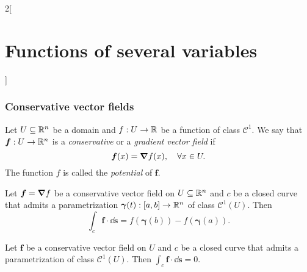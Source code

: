 \documentclass[../../../main.tex]{subfiles}
\begin{document}
\begin{multicols}{2}[\section{Functions of several variables}]
    \subsubsection*{Conservative vector fields}
    \begin{definition}
        Let $U\subseteq\mathbb{R}^n$ be a domain and $f:U\rightarrow\mathbb{R} $ be a function of class $\mathcal{C}^1$. We say that $\boldsymbol{f}:U\rightarrow\mathbb{R}^n$ is a \textit{conservative} or a \textit{gradient vector field} if $$\boldsymbol{f}(x)=\grad f(x),\quad \forall x\in U.$$ The function $f$ is called the \textit{potential} of $\boldsymbol{f}$.
    \end{definition}
    \begin{theorem}
        Let $\boldsymbol{f}=\grad f$ be a conservative vector field on $U\subseteq\mathbb{R}^n$ and $c$ be a closed curve that admits a parametrization $\boldsymbol{\gamma}(t):[a,b]\rightarrow\mathbb{R}^n$ of class $\mathcal{C}^1(U)$. Then $$\int_c\boldsymbol{f}\cdot \dd \textbf{s}=f(\boldsymbol{\gamma}(b))-f(\boldsymbol{\gamma}(a)).$$
    \end{theorem}
    \begin{corollary}
        Let $\boldsymbol{f}$ be a conservative vector field on $U$ and $c$ be a closed curve that admits a parametrization of class $\mathcal{C}^1(U)$. Then $\displaystyle\int_c\boldsymbol{f}\cdot \dd \textbf{s}=0$.
    \end{corollary}

\end{multicols}
\end{document}
